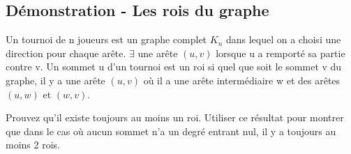 \subsection{Démonstration - Les rois du graphe}
Un tournoi de n joueurs est un graphe complet $K_{n}$ dans lequel on a choisi une direction pour chaque arête. $\exists$ une arête $(u,v)$ lorsque u a remporté sa partie contre v. Un sommet u d'un tournoi est un roi si quel que soit le sommet v du graphe, il y a une arête $(u,v)$ où il a une arête intermédiaire w et des arêtes $(u,w)$ et $(w,v)$.

Prouvez qu'il existe toujours au moins un roi.
Utiliser ce résultat pour montrer que dans le cas où aucun sommet n'a un degré entrant nul, il y a toujours au moins 2 rois.
